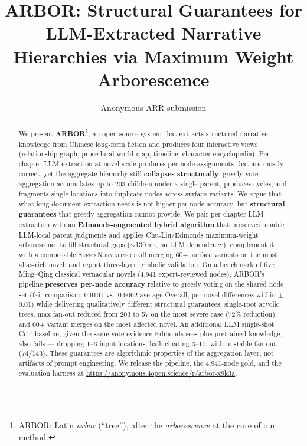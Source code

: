 \documentclass[11pt]{article}
\title{ARBOR: Structural Guarantees for LLM-Extracted Narrative Hierarchies via Maximum Weight Arborescence}
\author{Anonymous ARR submission}
\begin{document}
\maketitle

\begin{abstract}
We present \textbf{ARBOR}\footnote{ARBOR: Latin \emph{arbor} (``tree''), after the \emph{arborescence} at the core of our method.}, an open-source system that extracts structured narrative knowledge from Chinese long-form fiction and produces four interactive views (relationship graph, procedural world map, timeline, character encyclopedia). Per-chapter LLM extraction at novel scale produces per-node assignments that are mostly correct, yet the aggregate hierarchy still \textbf{collapses structurally}: greedy vote aggregation accumulates up to 203 children under a single parent, produces cycles, and fragments single locations into duplicate nodes across surface variants. We argue that what long-document extraction needs is not higher per-node accuracy, but \textbf{structural guarantees} that greedy aggregation cannot provide. We pair per-chapter LLM extraction with an \textbf{Edmonds-augmented hybrid algorithm} that preserves reliable LLM-local parent judgments and applies Chu-Liu/Edmonds maximum-weight arborescence to fill structural gaps ($\sim$130\,ms, no LLM dependency); complement it with a composable \textsc{SuffixNormalizer} skill merging 60+ surface variants on the most alias-rich novel; and report three-layer symbolic validation. On a benchmark of five Ming--Qing classical vernacular novels (4{,}941 expert-reviewed nodes), ARBOR's pipeline \textbf{preserves per-node accuracy} relative to greedy voting on the shared node set (fair comparison: 0.9101 vs.\ 0.9062 average Overall, per-novel differences within $\pm$0.01) while delivering qualitatively different structural guarantees: single-root acyclic trees, max fan-out reduced from 203 to 57 on the most severe case (72\% reduction), and 60+ variant merges on the most affected novel. An additional LLM single-shot CoT baseline, given the same vote evidence Edmonds sees plus pretrained knowledge, also fails --- dropping 1--6 input locations, hallucinating 3--10, with unstable fan-out (74/143). These guarantees are algorithmic properties of the aggregation layer, not artifacts of prompt engineering. We release the pipeline, the 4{,}941-node gold, and the evaluation harness at \url{https://anonymous.4open.science/r/arbor-x9k3a}.
\end{abstract}
\end{document}
